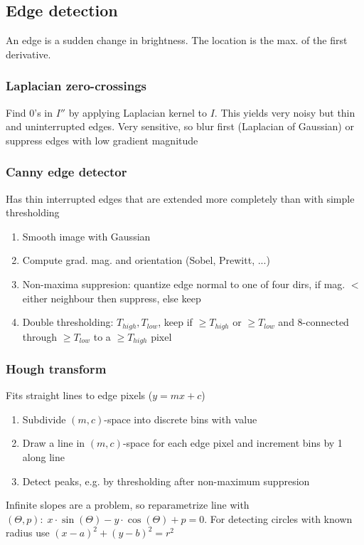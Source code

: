 \documentclass[a4paper,10pt]{article}
\begin{document}
\subsection{Edge detection}
An edge is a sudden change in brightness. The location is the max. of the first derivative.
\subsubsection{Laplacian zero-crossings} Find 0's in \( I'' \) by applying Laplacian kernel to \( I \). This yields very noisy but thin and uninterrupted edges. Very sensitive, so blur first (Laplacian of Gaussian) or suppress edges with low gradient magnitude
\subsubsection{Canny edge detector} Has thin interrupted edges that are extended more completely than with simple thresholding
    \begin{enumerate}
	\item Smooth image with Gaussian
	\item Compute grad. mag. and orientation (Sobel, Prewitt, ...)
	\item Non-maxima suppresion: quantize edge normal to one of four dirs, if mag. \( <\) either neighbour then suppress, else keep
	\item Double thresholding: \( T_{high}, T_{low} \), keep if \( \ge T_{high} \) or \( \ge T_{low} \) and 8-connected through \( \ge T_{low} \) to a \( \ge T_{high} \) pixel
    \end{enumerate}
\subsubsection{Hough transform} Fits straight lines to edge pixels (\( y = mx + c \))
    \begin{enumerate}
	\item Subdivide \( (m, c) \)-space into discrete bins with value 
	\item Draw a line in \( (m,c) \)-space for each edge pixel and increment bins by 1 along line
	\item Detect peaks, e.g. by thresholding after non-maximum suppresion
    \end{enumerate}
    Infinite slopes are a problem, so reparametrize line with \( (\Theta , p): \; x \cdot \sin (\Theta )- y \cdot \cos (\Theta ) + p = 0 \). For detecting circles with known radius use \( (x-a)^2+(y-b)^2 = r^2 \)
\end{document}
